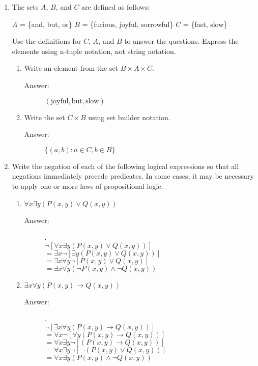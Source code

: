 \documentclass[12pt, oneside]{article}
\begin{document}
\begin{enumerate}

\item The sets $A$, $B$, and $C$ are defined as follows:

$A$ = \{and, but, or\}
$B$ = \{furious, joyful, sorrowful\}
$C$ = \{fast, slow\}

Use the definitions for $C$, $A$, and $B$ to answer the questions. Express the elements using n-tuple notation, not string notation.

\begin{enumerate}
    \item Write an element from the set $B \times A \times C$.
    \begin{description}
        \item[Answer:] $( \text{joyful}, \text{but}, \text{slow} )$
    \end{description}
    \item Write the set $C \times B$ using set builder notation.
    \begin{description}
        \item[Answer:] $\{ (a,b) : a \in C, b \in B \}$
    \end{description}
\end{enumerate}

 \item Write the negation of each of the following logical expressions so that all negations immediately precede predicates. In some cases, it may be necessary to apply one or more laws of propositional logic.

\begin{enumerate}
    \item $\forall x \exists y (P(x, y) \lor Q(x, y))$
    \begin{description}
        \item[Answer:] .\\
        $\lnot [\forall x \exists y (P(x, y) \lor Q(x, y))]$ \\
        $= \exists x \lnot [\exists y (P(x, y) \lor Q(x, y))]$ \\
        $= \exists x \forall y \lnot[P(x, y) \lor Q(x, y)]$ \\
        $= \exists x \forall y (\lnot P(x,y) \land \lnot Q(x,y))$
    \end{description}
    \item $\exists x \forall y (P(x, y) \to Q(x, y))$
    \begin{description}
        \item[Answer:] .\\
        $\lnot [\exists x \forall y (P(x, y) \to Q(x, y))]$ \\
        $= \forall x \lnot [\forall y (P(x, y) \to Q(x, y))]$ \\
        $= \forall x \exists y \lnot [(P(x, y) \to Q(x, y))]$ \\
        $= \forall x \exists y \lnot [\lnot (P(x, y) \lor Q(x, y))]$ \\
        $= \forall x \exists y (P(x, y) \land \lnot Q(x, y))$ \\
    \end{description}
\end{enumerate}



\end{enumerate}
\end{document}
